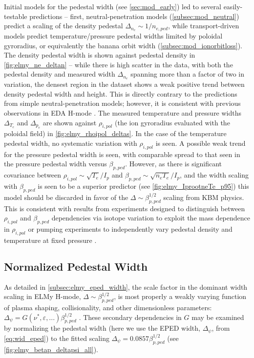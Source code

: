 Initial models for the pedestal width (see \cref{sec:mod_early}) led to several easily-testable predictions -- first, neutral-penetration models (\cref{subsec:mod_neutral}) predict a scaling of the density pedestal $\Delta_{n_e} \sim 1/n_{e,ped}$, while transport-driven models predict temperature/pressure pedestal widths limited by poloidal gyroradius, or equivalently the banana orbit width (\cref{subsec:mod_ionorbitloss}).  The density pedestal width is shown against pedestal density in \cref{fig:elmy_ne_deltan} -- while there is high scatter in the data, with both the pedestal density and measured width $\Delta_{n_e}$ spanning more than a factor of two in variation, the densest region in the dataset shows a weak positive trend between density pedestal width and height.  This is directly contrary to the predictions from simple neutral-penetration models; however, it is consistent with previous observations in EDA H-mode \cite{Hughes2002}.  The measured temperature and pressure widths $\Delta_{T_e}$ and $\Delta_{p_e}$ are shown against $\rho_{i,pol}$ (the ion gyroradius evaluated with the poloidal field) in \cref{fig:elmy_rhoipol_deltas}.  In the case of the temperature pedestal width, no systematic variation with $\rho_{i,pol}$ is seen.  A possible weak trend for the pressure pedestal width is seen, with comparable spread to that seen in the pressure pedestal width versus $\beta_{p,ped}$.  However, as there is significant covariance between $\rho_{i,pol} \sim \sqrt{T_e}/I_p$ and $\beta_{p,ped} \sim \sqrt{n_e T_e}/I_p$, and the width scaling with $\beta_{p,ped}$ is seen to be a superior predictor (see \cref{fig:elmy_IprootneTe_p95}) this model should be discarded in favor of the $\Delta \sim \beta_{p,ped}^{1/2}$ scaling from KBM physics.  This is consistent with results from experiments designed to distinguish between $\rho_{i,pol}$ and $\beta_{p,ped}$ dependencies via isotope variation to exploit the mass dependence in $\rho_{i,pol}$ \cite{Urano2008} or pumping experiments to independently vary pedestal density and temperature at fixed pressure \cite{Osborne1998,Maggi2010}.

\subsection{Normalized Pedestal Width}\label{subsec:elmy_normwidth}

As detailed in \cref{subsec:elmy_eped_width}, the scale factor in the dominant width scaling in ELMy H-mode, $\Delta \sim \beta_{p,ped}^{1/2}$, is most properly a weakly varying function of plasma shaping, collisionality, and other dimensionless parameters: $\Delta_\psi = G(\nu^*,\varepsilon,...) \beta_{p,ped}^{1/2}$ \cite{Snyder2011}.  These secondary dependencies in $G$ may be examined by normalizing the pedestal width (here we use the EPED width, $\Delta_\psi$, from \cref{eq:wid_eped}) to the fitted scaling $\Delta_\psi = 0.0857 \beta_{p,ped}^{1/2}$ (see \cref{fig:elmy_betap_deltapsi_all}).  

